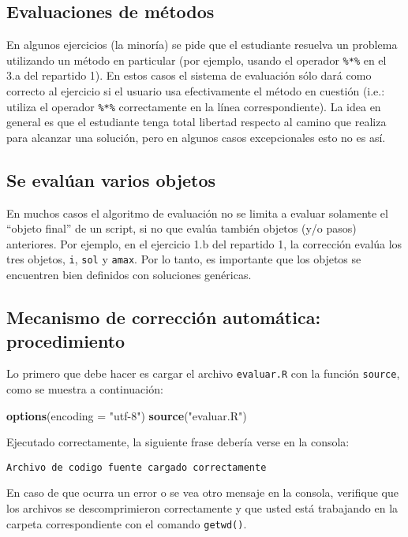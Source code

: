 \documentclass[]{article}
\newenvironment{Shaded}{}{}
\newcommand{\KeywordTok}[1]{\textcolor[rgb]{0.00,0.44,0.13}{\textbf{{#1}}}}
\newcommand{\DataTypeTok}[1]{\textcolor[rgb]{0.56,0.13,0.00}{{#1}}}
\newcommand{\StringTok}[1]{\textcolor[rgb]{0.25,0.44,0.63}{{#1}}}
\newcommand{\NormalTok}[1]{{#1}}
\begin{document}
\subsection{Evaluaciones de métodos}

En algunos ejercicios (la minoría) se pide que el estudiante resuelva un
problema utilizando un método en particular (por ejemplo, usando el
operador \texttt{\%*\%} en el 3.a del repartido 1). En estos casos el
sistema de evaluación sólo dará como correcto al ejercicio si el usuario
usa efectivamente el método en cuestión (i.e.: utiliza el operador
\texttt{\%*\%} correctamente en la línea correspondiente). La idea en
general es que el estudiante tenga total libertad respecto al camino que
realiza para alcanzar una solución, pero en algunos casos excepcionales
esto no es así.

\subsection{Se evalúan varios objetos}

En muchos casos el algoritmo de evaluación no se limita a evaluar
solamente el ``objeto final'' de un script, si no que evalúa también
objetos (y/o pasos) anteriores. Por ejemplo, en el ejercicio 1.b del
repartido 1, la corrección evalúa los tres objetos, \texttt{i},
\texttt{sol} y \texttt{amax}. Por lo tanto, es importante que los
objetos se encuentren bien definidos con soluciones genéricas.

\subsection{Mecanismo de corrección automática: procedimiento}

Lo primero que debe hacer es cargar el archivo \texttt{evaluar.R} con la
función \texttt{source}, como se muestra a continuación:

\begin{Shaded}
\begin{Highlighting}[]
\KeywordTok{options}\NormalTok{(}\DataTypeTok{encoding =} \StringTok{"utf-8"}\NormalTok{)}
\KeywordTok{source}\NormalTok{(}\StringTok{"evaluar.R"}\NormalTok{)}
\end{Highlighting}
\end{Shaded}
Ejecutado correctamente, la siguiente frase debería verse en la consola:

\begin{verbatim}
Archivo de codigo fuente cargado correctamente
\end{verbatim}
En caso de que ocurra un error o se vea otro mensaje en la consola,
verifique que los archivos se descomprimieron correctamente y que usted
está trabajando en la carpeta correspondiente con el comando
\texttt{getwd()}.
\end{document}
